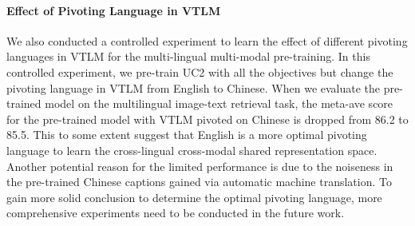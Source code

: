 \documentclass[final]{cvpr}
\begin{document}
\paragraph{Effect of Pivoting Language in VTLM} We also conducted a controlled experiment to learn the effect of different pivoting languages in VTLM for the multi-lingual multi-modal pre-training. In this controlled experiment, we pre-train UC2 with all the objectives but change the pivoting language in VTLM from English to Chinese. When we evaluate the pre-trained model on the multilingual image-text retrieval task, the meta-ave score for the pre-trained model with VTLM pivoted on Chinese is dropped from 86.2 to 85.5. This to some extent suggest that English is a more optimal pivoting language to learn the cross-lingual cross-modal shared representation space. Another potential reason for the limited performance is due to the noiseness in the pre-trained Chinese captions gained via automatic machine translation. To gain more solid conclusion to determine the optimal pivoting language, more comprehensive experiments need to be conducted in the future work. 
\end{document}
